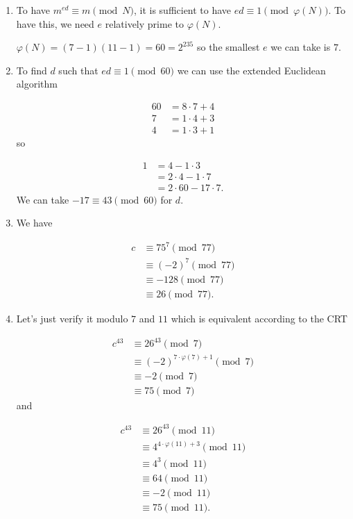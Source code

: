 \newape

\begin{solution}
  \begin{enumerate}
    \item
      To have $m^{ed} \equiv m \pmod{N}$,
      it is sufficient to have $ed \equiv 1 \pmod{\varphi(N)}$.
      To have this, we need $e$ relatively prime to $\varphi(N)$.

      $\varphi(N) = (7-1)(11-1) = 60 = 2^235$
      so the smallest $e$ we can take is $7$.
    \item
      To find $d$ such that $ed \equiv 1 \pmod{60}$ we
      can use the extended Euclidean algorithm

      \begin{align*}
        60 & = 8 \cdot 7 + 4\\
        7 & = 1 \cdot 4 + 3\\
        4 & = 1 \cdot 3 + 1
      \end{align*}
      so

      \begin{align*}
        1 & = 4 - 1 \cdot 3\\
          & = 2 \cdot 4 - 1 \cdot 7\\
          & = 2 \cdot 60 - 17 \cdot 7.
      \end{align*}
      We can take $-17 \equiv 43 \pmod{60}$ for $d$.
    \item
      We have

      \begin{align*}
        c & \equiv 75^7 \pmod{77}\\
          & \equiv (-2)^7 \pmod{77}\\
          & \equiv -128 \pmod{77}\\
          & \equiv 26 \pmod{77}.
      \end{align*}
    \item
      Let's just verify it modulo $7$ and $11$ which is equivalent
      according to the CRT

      \begin{align*}
        c^{43} & \equiv 26^{43} \pmod{7}\\
               & \equiv (-2)^{7 \cdot \varphi(7) + 1} \pmod{7}\\
               & \equiv -2 \pmod{7}\\
               & \equiv 75 \pmod{7}
      \end{align*}
      and

      \begin{align*}
        c^{43} & \equiv 26^{43} \pmod{11}\\
               & \equiv 4^{4 \cdot \varphi(11) + 3} \pmod{11}\\
               & \equiv 4^{3} \pmod{11}\\
               & \equiv 64 \pmod{11}\\
               & \equiv -2 \pmod{11}\\
               & \equiv 75 \pmod{11}.
      \end{align*}
  \end{enumerate}
\end{solution}

